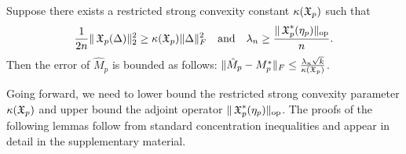 


\begin{lemma}
\label{lem:lowRank}
Suppose there exists a restricted strong convexity constant $\kappa(\operatorname{\mathfrak{X}}_p)$ such that
$$\frac{1}{2n} \| \operatorname{\mathfrak{X}}_p( \Delta )\|_2^2 \ge \kappa(\operatorname{\mathfrak{X}}_p) \|\Delta\|^2_F \quad \text{and} \quad
\lambda_n \ge \frac{\|\operatorname{\mathfrak{X}}_p^*(\eta_p)\|_{\textrm{op}}}{n}.$$
Then the error of $\hat M_p$ is bounded as follows:
$\| \hat M_p - M_p^* \|_F \le \frac{\lambda_n \sqrt{k}}{\kappa(\operatorname{\mathfrak{X}}_p)}$.
\end{lemma}

Going forward, we need to lower bound the restricted strong convexity
parameter $\kappa(\operatorname{\mathfrak{X}}_p)$ and upper bound the adjoint operator
$\|\operatorname{\mathfrak{X}}_p^*(\eta_p)\|_{\textrm{op}}$. The proofs of the following lemmas follow
from standard concentration inequalities and appear in detail in the
supplementary material.


